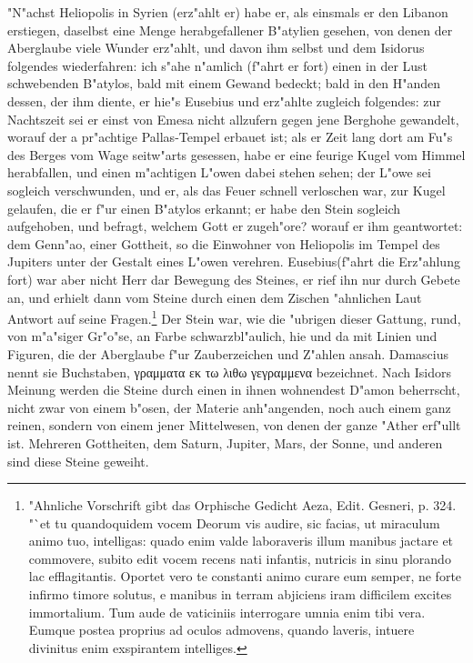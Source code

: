 \documentclass[a4paper, 11pt, oneside, polutonikogreek, german]{article}
\begin{document}
"N"achst Heliopolis in Syrien (erz"ahlt er) habe er, als einsmals er den Libanon erstiegen, daselbst eine Menge herabgefallener B"atylien gesehen, von denen der Aberglaube viele Wunder erz"ahlt, und davon ihm selbst und dem Isidorus folgendes wiederfahren: ich s"ahe n"amlich (f"ahrt er fort) einen in der Lust schwebenden B"atylos, bald mit einem Gewand bedeckt; bald in den H"anden dessen, der ihm diente, er hie"s Eusebius und erz"ahlte zugleich folgendes: zur Nachtszeit sei er einst von Emesa nicht allzufern gegen jene Berghohe gewandelt, worauf der a pr"achtige Pallas-Tempel erbauet ist; als er Zeit lang dort am Fu"s des Berges vom Wage seitw"arts gesessen, habe er eine feurige Kugel vom Himmel herabfallen, und einen m"achtigen L"owen dabei stehen sehen; der L"owe sei sogleich verschwunden, und er, als das Feuer schnell verloschen war, zur Kugel gelaufen, die er f"ur einen B"atylos erkannt; er habe den Stein sogleich aufgehoben, und befragt, welchem Gott er zugeh"ore? worauf er ihm geantwortet: dem Genn"ao, einer Gottheit, so die Einwohner von Heliopolis im Tempel des Jupiters unter der Gestalt eines L"owen verehren. Eusebius(f"ahrt die Erz"ahlung fort) war aber nicht Herr dar Bewegung des Steines, er rief ihn nur durch Gebete an, und erhielt dann vom Steine durch einen dem Zischen "ahnlichen Laut Antwort auf seine Fragen.\footnote{"Ahnliche Vorschrift gibt das Orphische Gedicht Aeza, Edit. Gesneri, p. 324. "`et tu quandoquidem vocem Deorum vis audire, sic facias, ut miraculum animo tuo, intelligas: quado enim valde laboraveris illum manibus jactare et commovere, subito edit vocem recens nati infantis, nutricis in sinu plorando lac efflagitantis. Oportet vero te constanti animo curare eum semper, ne forte infirmo timore solutus, e manibus in terram abjiciens iram difficilem excites immortalium. Tum aude de vaticiniis interrogare umnia enim tibi vera. Eumque postea proprius ad oculos admovens, quando laveris, intuere divinitus enim exspirantem intelliges.} Der Stein war, wie die "ubrigen dieser Gattung, rund, von m"a"siger Gr"o"se, an Farbe schwarzbl"aulich, hie und da mit Linien und Figuren, die der Aberglaube f"ur Zauberzeichen und Z"ahlen ansah. Damascius nennt sie Buchstaben, γραμματα εκ τω λιθω γεγραμμενα bezeichnet. Nach Isidors Meinung werden die Steine durch einen in ihnen wohnendest D"amon beherrscht, nicht zwar von einem b"osen, der Materie anh"angenden, noch auch einem ganz reinen, sondern von einem jener Mittelwesen, von denen der ganze "Ather erf"ullt ist. Mehreren Gottheiten, dem Saturn, Jupiter, Mars, der Sonne, und anderen sind diese Steine geweiht.
\end{document}
